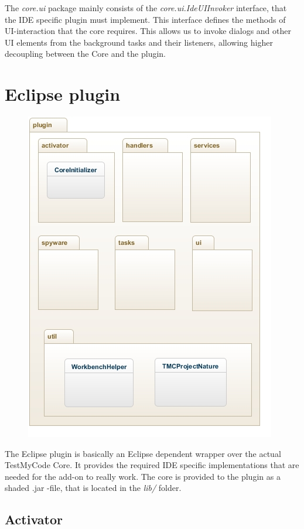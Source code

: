 \documentclass[12pt,a4paper,english,leqno]{article}
\begin{document}
The \textit{core.ui} package mainly consists of the \textit{core.ui.IdeUIInvoker} interface, that the IDE specific plugin must implement.
This interface defines the methods of UI-interaction that the core requires.
This allows us to invoke dialogs and other UI elements from the background tasks and their listeners, allowing higher decoupling between the Core and the plugin.

\pagebreak
\section{Eclipse plugin}

\begin{figure}[H]
\centering
\includegraphics[scale=1]{img/plugin.jpg}
\end{figure}

The Eclipse plugin is basically an Eclipse dependent wrapper over the actual TestMyCode Core. It provides the required IDE specific implementations that are needed for the add-on to really work.
The core is provided to the plugin as a shaded .jar -file, that is located in the \textit{lib/} folder.

\subsection{Activator}
\end{document}
